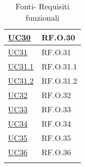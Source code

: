\begin{longtable}{|P{4,5cm}|>{\arraybackslash}P{9cm}|}
  \hline
  \hyperref[UC30]{UC30} & RF.O.30 \\
  \hline
  \hyperref[UC31]{UC31} & RF.O.31 \\
  \hline
  \hyperref[UC31point1]{UC31.1} & RF.O.31.1 \\
  \hline
  \hyperref[UC31point2]{UC31.2} & RF.O.31.2 \\
  \hline
  \hyperref[UC32]{UC32} & RF.O.32 \\
  \hline
  \hyperref[UC33]{UC33} & RF.O.33 \\
  \hline
  \hyperref[UC34]{UC34} & RF.O.34 \\
  \hline
  \hyperref[UC35]{UC35} & RF.O.35\\
  \hline
  \hyperref[UC36]{UC36} & RF.O.36 \\
  \hline
\caption{Fonti- Requisiti funzionali}
\end{longtable}
